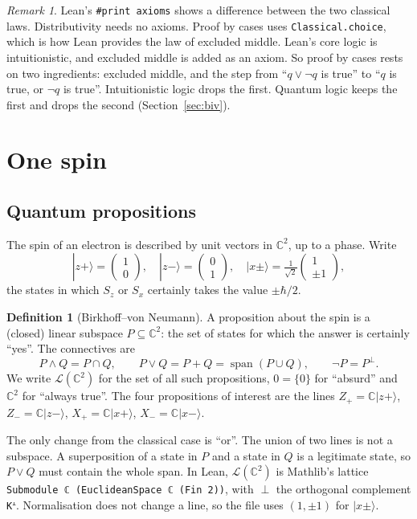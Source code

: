 \documentclass[11pt,a4paper]{article}
\newcommand{\lean}[1]{\VerbatimInput{snippets/#1.lean}}
\theoremstyle{plain}
\theoremstyle{definition}
\newtheorem{definition}[theorem]{Definition}
\theoremstyle{remark}
\newtheorem*{remark}{Remark}
\newcommand{\C}{\mathbb{C}}
\newcommand{\ket}[1]{|#1\rangle}
\newcommand{\Zp}{Z_{+}}\newcommand{\Zm}{Z_{-}}\newcommand{\Xp}{X_{+}}\newcommand{\Xm}{X_{-}}
\newcommand{\Lsub}{\mathcal{L}(\C^2)}
\begin{document}
\begin{remark}
Lean's \texttt{\#print axioms} shows a difference between the two classical laws. Distributivity needs no axioms. Proof by cases uses \texttt{Classical.choice}, which is how Lean provides the law of excluded middle. Lean's core logic is intuitionistic, and excluded middle is added as an axiom. So proof by cases rests on two ingredients: excluded middle, and the step from ``$q\vee\neg q$ is true'' to ``$q$ is true, or $\neg q$ is true''. Intuitionistic logic drops the first. Quantum logic keeps the first and drops the second (Section~\ref{sec:biv}).
\end{remark}

\section{One spin}

\subsection{Quantum propositions}
The spin of an electron is described by unit vectors in $\C^2$, up to a phase. Write
\[
 \ket{z{+}}=\begin{pmatrix}1\\0\end{pmatrix},\quad
 \ket{z{-}}=\begin{pmatrix}0\\1\end{pmatrix},\quad
 \ket{x{\pm}}=\tfrac{1}{\sqrt2}\begin{pmatrix}1\\\pm1\end{pmatrix},
\]
the states in which $S_z$ or $S_x$ certainly takes the value $\pm\hbar/2$.

\begin{definition}[Birkhoff--von Neumann]
A proposition about the spin is a (closed) linear subspace $P\subseteq\C^2$: the set of states for which the answer is certainly ``yes''. The connectives are
\[
 P\wedge Q=P\cap Q,\qquad P\vee Q=P+Q=\operatorname{span}(P\cup Q),\qquad \neg P=P^{\perp}.
\]
We write $\Lsub$ for the set of all such propositions, $0=\{0\}$ for ``absurd'' and $\C^2$ for ``always true''. The four propositions of interest are the lines
$\Zp=\C\ket{z{+}}$, $\Zm=\C\ket{z{-}}$, $\Xp=\C\ket{x{+}}$, $\Xm=\C\ket{x{-}}$.
\end{definition}

The only change from the classical case is ``or''. The union of two lines is not a subspace. A superposition of a state in $P$ and a state in $Q$ is a legitimate state, so $P\vee Q$ must contain the whole span. In Lean, $\Lsub$ is Mathlib's lattice \texttt{Submodule ℂ (EuclideanSpace ℂ (Fin 2))}, with $\perp$ the orthogonal complement \texttt{Kᗮ}. Normalisation does not change a line, so the file uses $(1,\pm1)$ for $\ket{x{\pm}}$.
\lean{defs_spin}
\end{document}
